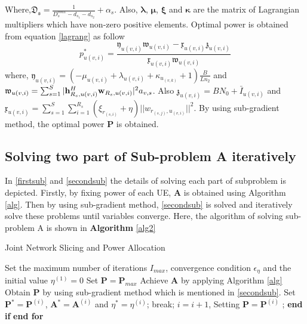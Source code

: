 \documentclass[conference]{IEEEtran}
\begin{document}
Where,$\mathfrak{D_s}=\frac{1}{D_{s}^{max}-d_{s_1}-d_{s_2}}+\alpha_s$. Also, $\boldsymbol{\lambda}$, $\boldsymbol{\mu}$, $\boldsymbol{\xi}$ and $\boldsymbol{ \kappa}$ are the matrix of Lagrangian multipliers which have non-zero positive elements. Optimal power is obtained from equation \eqref{lagrang} as follow
\begin{equation}
p_{u(v,i)}^{*} = \frac{\mathfrak{y}_{u(v,i)}\mathfrak{w}_{u(v,i)}-\mathfrak{x}_{u(v,i)}\mathfrak{z}_{u(v,i)}}{\mathfrak{x}_{u(v,i)}\mathfrak{w}_{u(v,i)} }
\end{equation}
where, $\mathfrak{y}_{u(v,i)}= (-\mu_{u(v,i)}+\lambda_{u(v,i)}+\kappa_{u_{(v,k)}}+1)\frac{B}{Ln_2}$ and 
$\mathfrak{w}_{u(v,i)} = \sum_{s=1}^{S}|\bold{h}_{R_s,u(v,i)}^H \bold{w}_{R_s,u(v,i)}|^2 a_{v,s}$. Also 
$\mathfrak{z}_{u(v,i)} = BN_0 + \bar{I}_{u(v,i)}$ and $\mathfrak{x}_{u(v,i)} = \sum\limits_{s=1}^{S} \sum\limits_{i=1}^{R_s} (\xi_{r_{(s,i)}}+\eta)||w_{r_{(s,j)},u_{(v,i)}}||^2$. 
By using sub-gradient method, the optimal power $\boldsymbol{P}$ is obtained. 
\subsection{Solving two part of Sub-problem A iteratively}
In \eqref{firstsub} and \eqref{secondsub} the details of solving each part of subproblem is depicted. 
Firstly, by fixing power of each UE, $\boldsymbol{A}$ is obtained using Algorithm \eqref{alg}. Then by using sub-gradient method, \eqref{secondsub} is solved and iteratively solve these problems until variables converge.
Here, the algorithm of solving sub-problem A is shown in \textbf{Algorithm} \eqref{alg2}
\begin{algorithm}
\caption{Joint Network Slicing and Power Allocation}\label{alg2}
\begin{algorithmic}[1]
\State Set the maximum number of iterations $I_{max}$, convergence condition $\epsilon_{\eta}$  and the initial value $\eta^{(1)} = 0$
\State Set $\boldsymbol{P} = \boldsymbol{P}_{max}$
\State Achieve $\boldsymbol{A}$ by applying Algorithm \eqref{alg}
\State Obtain $\boldsymbol{P}$ by using sub-gradient method which is mentioned in \eqref{secondsub}.
\State Set $\boldsymbol{P}^*= \boldsymbol{P}^{(i)} $, $\boldsymbol{A}^*= \boldsymbol{A}^{(i)} $   and  $ \eta^{*} =\eta^{(i)} $;
\State break;
\Else
\State $i= i+1$, Setting $\boldsymbol{P} = \boldsymbol{P}^{(i)}$ ;
\EndIf 
\State \textbf{end if}
\EndFor 
\State \textbf{end for}
\end{algorithmic}
\end{algorithm}
\end{document}
